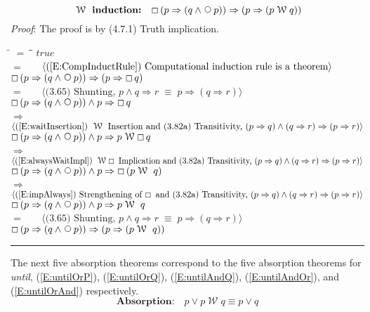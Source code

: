 \documentclass[12pt, fleqn, leqno]{article}
\newcommand{\lgap}{2pt}                             %
\newcommand{\mymathindent}{24pt}                    %
\newcommand{\equivs}{\ensuremath{\;\equiv\;}}       %
\newcommand{\impl}{\ensuremath{\Rightarrow}}        %
\newcommand{\Wait}{\;\mathcal{W}\;}
\newcommand{\Next}{\;\,\text{\raisebox{3.5pt}{\circle{6}}}}
\newcommand{\Always}{\Box\,}
\newcommand{\myqed}{\rule[-.23ex]{1.2ex}{2.0ex}}
\newcommand{\myqedtab}{\hspace{384pt}}              %
\newcommand{\Gll} {\langle}                         %
\newcommand{\Ggg} {\rangle}                         %
\newcommand{\Hint}[1]     {\ \ \ $\Gll              \mbox{#1} \Ggg$ }   %
\begin{document}
\begin{equation}\label{E:waitInduct2}
\textbf{$\Wait$ induction:}\quad \Always (p \impl (q \land \Next p)) \impl  (p \impl (p \Wait q))
\end{equation}
\emph{Proof}: The proof is by (4.7.1) Truth implication.
\begin{tabbing}
\hspace{\mymathindent} \= $= \;$ \= \myqedtab \= \kill
  \> \>   $true$\\[\lgap]
  \> $=$  \>  \Hint{(\ref{E:CompInductRule}) Computational induction rule is a theorem}\\[\lgap]
  \> \>   $\Always ( p \impl (q \land \Next p)) \impl (p \impl \Always q)$\\[\lgap]
   \> $=$  \>  \Hint{(3.65) Shunting, $p\land q\impl r\equivs p\impl (q\impl r)$}\\[\lgap]
   \> \>   $\Always ( p \impl (q \land \Next p)) \land p  \impl \Always q$\\[\lgap]
  \> $\impl$  \>  \Hint{(\ref{E:waitInsertion}) $\Wait$ Insertion and (3.82a) Transitivity, $(p\impl q) \land (q\impl r) \impl (p\impl r)$}\\[\lgap]
  \> \>   $\Always ( p \impl (q \land \Next p)) \land p  \impl  p \Wait \Always q$\\[\lgap]
  \> $\impl$  \>  \Hint{(\ref{E:alwaysWaitImpl}) $\Wait\Always$ Implication and (3.82a) Transitivity, $(p\impl q) \land (q\impl r) \impl (p\impl r)$}\\[\lgap]
  \> \>   $\Always ( p \impl (q \land \Next p)) \land p \impl \Always (p \Wait \ q)$\\[\lgap]
    \> $\impl$  \>  \Hint{(\ref{E:impAlways}) Strengthening of $\Always$ and (3.82a) Transitivity, $(p\impl q) \land (q\impl r) \impl (p\impl r)$}\\[\lgap]
  \> \>   $\Always ( p \impl (q \land \Next p)) \land p \impl p \Wait \ q$ \\[\lgap]
  \> $=$  \>  \Hint{(3.65) Shunting, $p\land q\impl r\equivs p\impl (q\impl r)$}\\[\lgap]
   \> \>   $\Always ( p \impl (q \land \Next p)) \impl (p \impl  (p \Wait \ q))$ \quad \myqed
\end{tabbing}

The next five absorption theorems correspond to the five absorption theorems for \textit{until},
(\ref{E:untilOrP}),
(\ref{E:untilOrQ}),
(\ref{E:untilAndQ}),
(\ref{E:untilAndOr}),
and
(\ref{E:untilOrAnd})
respectively.
\begin{equation}\label{E:waitOrP}
\textbf{Absorption:}\quad p\lor p\Wait q\equiv p\lor q
\end{equation}
\end{document}
